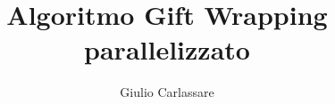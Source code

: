 \documentclass[a4paper,11pt]{article}
\begin{document}
\author{Giulio Carlassare}
\title{Algoritmo Gift Wrapping parallelizzato}
\maketitle

\tableofcontents




\end{document}
